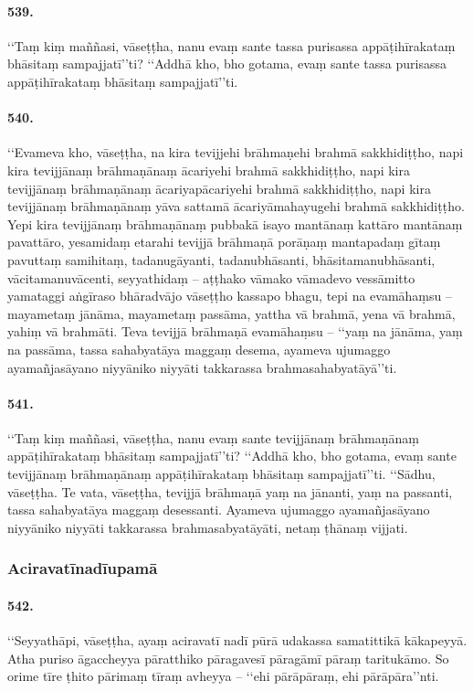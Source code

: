 \paragraph{539.} ‘‘Taṃ kiṃ maññasi, vāseṭṭha, nanu evaṃ sante tassa purisassa appāṭihīrakataṃ bhāsitaṃ sampajjatī’’ti? ‘‘Addhā kho, bho gotama, evaṃ sante tassa purisassa appāṭihīrakataṃ bhāsitaṃ sampajjatī’’ti.

\paragraph{540.} ‘‘Evameva kho, vāseṭṭha, na kira tevijjehi brāhmaṇehi brahmā sakkhidiṭṭho, napi kira tevijjānaṃ brāhmaṇānaṃ ācariyehi brahmā sakkhidiṭṭho, napi kira tevijjānaṃ brāhmaṇānaṃ ācariyapācariyehi brahmā sakkhidiṭṭho, napi kira tevijjānaṃ brāhmaṇānaṃ yāva sattamā ācariyāmahayugehi brahmā sakkhidiṭṭho. Yepi kira tevijjānaṃ brāhmaṇānaṃ pubbakā isayo mantānaṃ kattāro mantānaṃ pavattāro, yesamidaṃ etarahi tevijjā brāhmaṇā porāṇaṃ mantapadaṃ gītaṃ pavuttaṃ samihitaṃ, tadanugāyanti, tadanubhāsanti, bhāsitamanubhāsanti, vācitamanuvācenti, seyyathidaṃ – aṭṭhako vāmako vāmadevo vessāmitto yamataggi aṅgīraso bhāradvājo vāseṭṭho kassapo bhagu, tepi na evamāhaṃsu – mayametaṃ jānāma, mayametaṃ passāma, yattha vā brahmā, yena vā brahmā, yahiṃ vā brahmāti. Teva tevijjā brāhmaṇā evamāhaṃsu – ‘‘yaṃ na jānāma, yaṃ na passāma, tassa sahabyatāya maggaṃ desema, ayameva ujumaggo ayamañjasāyano niyyāniko niyyāti takkarassa brahmasahabyatāyā’’ti.

\paragraph{541.} ‘‘Taṃ kiṃ maññasi, vāseṭṭha, nanu evaṃ sante tevijjānaṃ brāhmaṇānaṃ appāṭihīrakataṃ bhāsitaṃ sampajjatī’’ti? ‘‘Addhā kho, bho gotama, evaṃ sante tevijjānaṃ brāhmaṇānaṃ appāṭihīrakataṃ bhāsitaṃ sampajjatī’’ti. ‘‘Sādhu, vāseṭṭha. Te vata, vāseṭṭha, tevijjā brāhmaṇā yaṃ na jānanti, yaṃ na passanti, tassa sahabyatāya maggaṃ desessanti. Ayameva ujumaggo ayamañjasāyano niyyāniko niyyāti takkarassa brahmasabyatāyāti, netaṃ ṭhānaṃ vijjati.

\subsubsection{Aciravatīnadīupamā}

\paragraph{542.} ‘‘Seyyathāpi, vāseṭṭha, ayaṃ aciravatī nadī pūrā udakassa samatittikā kākapeyyā. Atha puriso āgaccheyya pāratthiko pāragavesī pāragāmī pāraṃ taritukāmo. So orime tīre ṭhito pārimaṃ tīraṃ avheyya – ‘‘ehi pārāpāraṃ, ehi pārāpāra’’nti.

